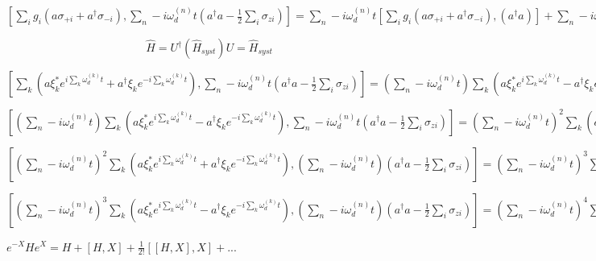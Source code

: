 \documentclass[11pt, spanish]{report}
\begin{document}
$[\sum\limits_i g_i (a \sigma_{+ i} + a^\dagger \sigma_{- i}), \sum\limits_n-i \omega_d^{(n)} t(a^\dagger a - \frac{1}{2} \sum\limits_i \sigma_{z i})] =
\sum\limits_n-i \omega_d^{(n)} t [\sum\limits_i g_i (a \sigma_{+ i} + a^\dagger \sigma_{- i}), (a^\dagger a)] 
+ \sum\limits_n-i \omega_d^{(n)} t [\sum\limits_i g_i (a \sigma_{+ i} + a^\dagger \sigma_{- i}), (- \frac{1}{2} \sum\limits_i \sigma_{z i})] =
\sum\limits_n-i \omega_d^{(n)} t \sum\limits_i g_i (a \sigma_{+ i} - a^\dagger \sigma_{- i})
- \sum\limits_n-i \omega_d^{(n)} t \sum\limits_i g_i (a \sigma_{+ i} - a^\dagger \sigma_{- i}) = 0 $

$$\hat{H} = U^\dagger (\hat{H}_{syst}) U = \hat{H}_{syst} $$

$[\sum\limits_k (a\xi_k^*e^{i\sum\limits_k \omega_d^{(k)}t}+
a^\dagger\xi_ke^{-i\sum\limits_k \omega_d^{(k)}t}), \sum\limits_n-i \omega_d^{(n)} t(a^\dagger a - \frac{1}{2} \sum\limits_i \sigma_{z i})] =
(\sum\limits_n-i \omega_d^{(n)} t) \sum\limits_k (a\xi_k^*e^{i\sum\limits_k
  \omega_d^{(k)}t} - a^\dagger\xi_ke^{-i\sum\limits_k \omega_d^{(k)}t})
$

$[(\sum\limits_n-i \omega_d^{(n)} t) \sum\limits_k (a\xi_k^*e^{i\sum\limits_k
  \omega_d^{(k)}t} - a^\dagger\xi_ke^{-i\sum\limits_k \omega_d^{(k)}t}), \sum\limits_n-i \omega_d^{(n)} t(a^\dagger a - \frac{1}{2} \sum\limits_i \sigma_{z i})] =
(\sum\limits_n-i \omega_d^{(n)} t)^2 \sum\limits_k (a\xi_k^*e^{i\sum\limits_k
  \omega_d^{(k)}t} + a^\dagger\xi_ke^{-i\sum\limits_k \omega_d^{(k)}t}) $
 
$[(\sum\limits_n-i \omega_d^{(n)} t)^2 \sum\limits_k (a\xi_k^*e^{i\sum\limits_k
  \omega_d^{(k)}t}+ a^\dagger\xi_ke^{-i\sum\limits_k \omega_d^{(k)}t}), (\sum\limits_n-i \omega_d^{(n)} t)(a^\dagger a - \frac{1}{2} \sum\limits_i \sigma_{z i})] =
(\sum\limits_n-i \omega_d^{(n)} t)^3 \sum\limits_k (a\xi_k^*e^{i\sum\limits_k
  \omega_d^{(k)}t} - a^\dagger\xi_ke^{-i\sum\limits_k \omega_d^{(k)}t})
$

$[(\sum\limits_n-i \omega_d^{(n)} t)^3 \sum\limits_k (a\xi_k^*e^{i\sum\limits_k
  \omega_d^{(k)}t} - a^\dagger\xi_ke^{-i\sum\limits_k \omega_d^{(k)}t}), (\sum\limits_n-i \omega_d^{(n)} t)(a^\dagger a - \frac{1}{2} \sum\limits_i \sigma_{z i})] =
(\sum\limits_n-i \omega_d^{(n)} t)^4 \sum\limits_k (a\xi_k^*e^{i\sum\limits_k
  \omega_d^{(k)}t} + a^\dagger\xi_ke^{-i\sum\limits_k \omega_d^{(k)}t}) $


$e^{-X} H e^{X} = H + [H,X] +
\frac{1}{2!}[[H,X],X] + ...$

\end{document}
